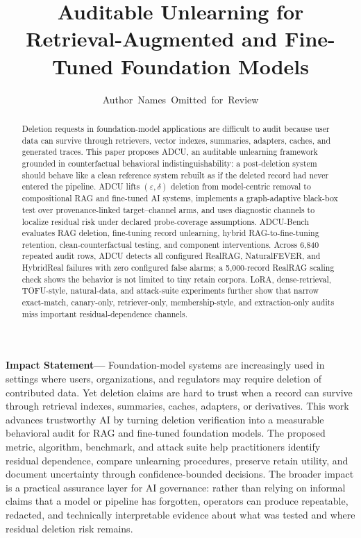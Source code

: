 \documentclass[10pt,journal,compsoc]{IEEEtran}
\newcommand{\method}{ADCU}
\newcommand{\bench}{ADCU-Bench}
\begin{document}
\title{Auditable Unlearning for Retrieval-Augmented and Fine-Tuned Foundation Models}

\author{Author~Names~Omitted~for~Review}


\maketitle

\begin{abstract}
Deletion requests in foundation-model applications are difficult to audit because user data can survive through retrievers, vector indexes, summaries, adapters, caches, and generated traces. This paper proposes \method{}, an auditable unlearning framework grounded in counterfactual behavioral indistinguishability: a post-deletion system should behave like a clean reference system rebuilt as if the deleted record had never entered the pipeline. \method{} lifts $(\varepsilon,\delta)$ deletion from model-centric removal to compositional RAG and fine-tuned AI systems, implements a graph-adaptive black-box test over provenance-linked target--channel arms, and uses diagnostic channels to localize residual risk under declared probe-coverage assumptions. \bench{} evaluates RAG deletion, fine-tuning record unlearning, hybrid RAG-to-fine-tuning retention, clean-counterfactual testing, and component interventions. Across 6,840 repeated audit rows, \method{} detects all configured RealRAG, NaturalFEVER, and HybridReal failures with zero configured false alarms; a 5,000-record RealRAG scaling check shows the behavior is not limited to tiny retain corpora. LoRA, dense-retrieval, TOFU-style, natural-data, and attack-suite experiments further show that narrow exact-match, canary-only, retriever-only, membership-style, and extraction-only audits miss important residual-dependence channels.
\end{abstract}

\noindent\textbf{Impact Statement---}
Foundation-model systems are increasingly used in settings where users, organizations, and regulators may require deletion of contributed data. Yet deletion claims are hard to trust when a record can survive through retrieval indexes, summaries, caches, adapters, or derivatives. This work advances trustworthy AI by turning deletion verification into a measurable behavioral audit for RAG and fine-tuned foundation models. The proposed metric, algorithm, benchmark, and attack suite help practitioners identify residual dependence, compare unlearning procedures, preserve retain utility, and document uncertainty through confidence-bounded decisions. The broader impact is a practical assurance layer for AI governance: rather than relying on informal claims that a model or pipeline has forgotten, operators can produce repeatable, redacted, and technically interpretable evidence about what was tested and where residual deletion risk remains.
\end{document}
